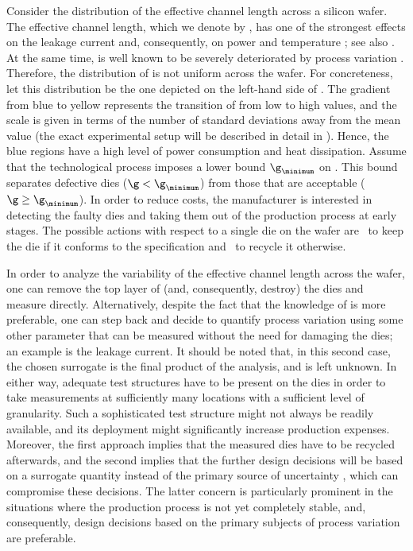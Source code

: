 Consider the distribution of the effective channel length across a silicon
wafer. The effective channel length, which we denote by \g, has one of the
strongest effects on the leakage current and, consequently, on power and
temperature \cite{juan2012}; see also . At the same time, \g
is well known to be severely deteriorated by process variation
\cite{chandrakasan2000, srivastava2010}. Therefore, the distribution of \g is
not uniform across the wafer. For concreteness, let this distribution be the one
depicted on the left-hand side of . The gradient from
blue to yellow represents the transition of \g from low to high values, and the
scale is given in terms of the number of standard deviations away from the mean
value (the exact experimental setup will be described in detail in
). Hence, the blue regions have a high level of power
consumption and heat dissipation. Assume that the technological process imposes
a lower bound $\g_\minimum$ on \g. This bound separates defective dies ($\g <
\g_\minimum$) from those that are acceptable ($\g \geq \g_\minimum$). In order
to reduce costs, the manufacturer is interested in detecting the faulty dies and
taking them out of the production process at early stages. The possible actions
with respect to a single die on the wafer are \one~to keep the die if it
conforms to the specification and \two~to recycle it otherwise.

In order to analyze the variability of the effective channel length \g across
the wafer, one can remove the top layer of (and, consequently, destroy) the dies
and measure \g directly. Alternatively, despite the fact that the knowledge of
\g is more preferable, one can step back and decide to quantify process
variation using some other parameter \h that can be measured without the need
for damaging the dies; an example is the leakage current. It should be noted
that, in this second case, the chosen surrogate is the final product of the
analysis, and \g is left unknown. In either way, adequate test structures have
to be present on the dies in order to take measurements at sufficiently many
locations with a sufficient level of granularity. Such a sophisticated test
structure might not always be readily available, and its deployment might
significantly increase production expenses. Moreover, the first approach implies
that the measured dies have to be recycled afterwards, and the second implies
that the further design decisions will be based on a surrogate quantity \h
instead of the primary source of uncertainty \g, which can compromise these
decisions. The latter concern is particularly prominent in the situations where
the production process is not yet completely stable, and, consequently, design
decisions based on the primary subjects of process variation are preferable.

